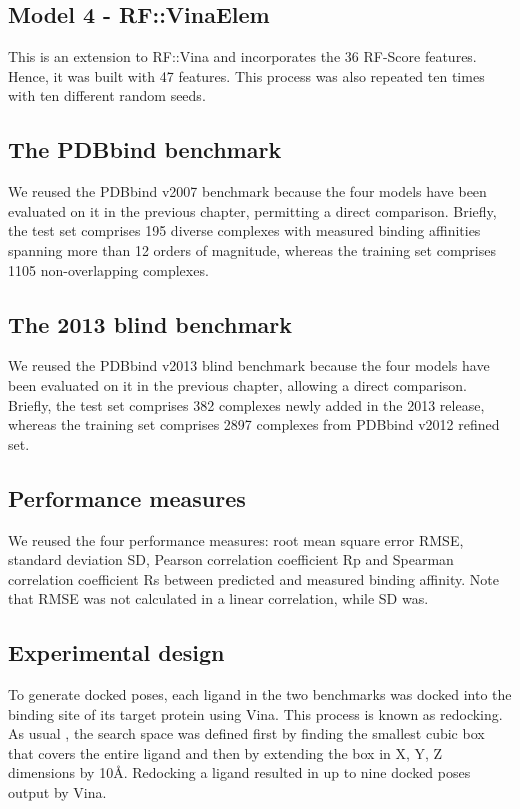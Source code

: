 \subsection{Model 4 - RF::VinaElem}

This is an extension to RF::Vina and incorporates the 36 RF-Score features. Hence, it was built with 47 features. This process was also repeated ten times with ten different random seeds.

\subsection{The PDBbind benchmark}

We reused the PDBbind v2007 benchmark because the four models have been evaluated on it in the previous chapter, permitting a direct comparison. Briefly, the test set comprises 195 diverse complexes with measured binding affinities spanning more than 12 orders of magnitude, whereas the training set comprises 1105 non-overlapping complexes.

\subsection{The 2013 blind benchmark}

We reused the PDBbind v2013 blind benchmark because the four models have been evaluated on it in the previous chapter, allowing a direct comparison. Briefly, the test set comprises 382 complexes newly added in the 2013 release, whereas the training set comprises 2897 complexes from PDBbind v2012 refined set.

\subsection{Performance measures}

We reused the four performance measures: root mean square error RMSE, standard deviation SD, Pearson correlation coefficient Rp and Spearman correlation coefficient Rs between predicted and measured binding affinity. Note that RMSE was not calculated in a linear correlation, while SD was.

\subsection{Experimental design}

To generate docked poses, each ligand in the two benchmarks was docked into the binding site of its target protein using Vina. This process is known as redocking. As usual \citep{1362}, the search space was defined first by finding the smallest cubic box that covers the entire ligand and then by extending the box in X, Y, Z dimensions by 10\AA. Redocking a ligand resulted in up to nine docked poses output by Vina.

